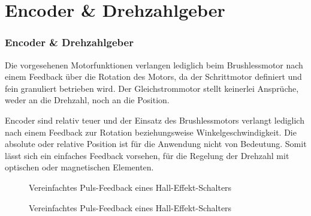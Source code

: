 \ifSTANDALONE
\section{Encoder \& Drehzahlgeber}
\fi
\ifEMBED
\subsubsection{Encoder \& Drehzahlgeber}
\fi

Die vorgesehenen Motorfunktionen verlangen lediglich beim Brushlessmotor
nach einem Feedback über die Rotation des Motors, da der Schrittmotor
definiert und fein granuliert betrieben wird. Der Gleichstrommotor stellt
keinerlei Ansprüche, weder an die Drehzahl, noch an die Position.

Encoder sind relativ teuer und der Einsatz des Brushlessmotors verlangt
lediglich nach einem Feedback zur Rotation beziehungsweise Winkelgeschwindigkeit.
Die absolute oder relative Position ist für die Anwendung nicht von
Bedeutung. Somit lässt sich ein einfaches Feedback vorsehen, für die
Regelung der Drehzahl mit optischen oder magnetischen Elementen.
\ifSTANDALONE
\begin{figure}[h!]
	\centering
	\caption{Vereinfachtes Puls-Feedback eines Hall-Effekt-Schalters}
	\label{fig:hall-effekt-schalter}
\end{figure}
\fi
\ifEMBED
\begin{figure}[h!]
	\centering
	\caption{Vereinfachtes Puls-Feedback eines Hall-Effekt-Schalters}
	\label{fig:hall-effekt-schalter}
\end{figure}
